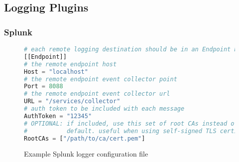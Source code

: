\subsection{Logging Plugins}

\subsubsection{Splunk}

\begin{figure}[H]
\begin{lstlisting}[language=Python,frame=single]
# each remote logging destination should be in an Endpoint block
[[Endpoint]]
# the remote endpoint host
Host = "localhost"
# the remote endpoint event collector point
Port = 8088
# the remote endpoint event collector url
URL = "/services/collector"
# auth token to be included with each message
AuthToken = "12345"
# OPTIONAL: if included, use this set of root CAs instead of the system
#			default. useful when using self-signed TLS certificates
RootCAs = ["/path/to/ca/cert.pem"]
\end{lstlisting}
\caption{Example Splunk logger configuration file}
\end{figure}

